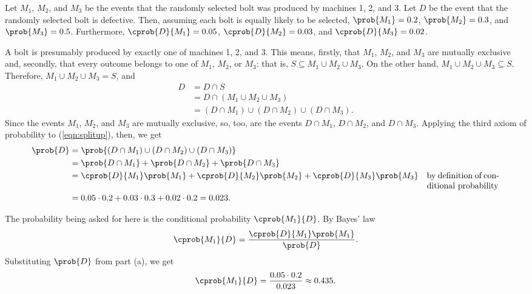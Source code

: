 \documentclass[11pt, newpage]{homework}
\begin{document}
Let \(M_1\), \(M_2\), and \(M_3\) be the events that the randomly selected bolt was produced by machines 1, 2, and 3. Let \(D\) be the event that the randomly selected bolt is defective. Then, assuming each bolt is equally likely to be selected, \(\prob{M_1} = 0.2\), \(\prob{M_2} = 0.3\), and \(\prob{M_3} = 0.5\). Furthermore, \(\cprob{D}{M_1} = 0.05\), \(\cprob{D}{M_2} = 0.03\), and \(\cprob{D}{M_3} = 0.02\).

\begin{alphaparts}
	\questionpart %
	A bolt is presumably produced by exactly one of machines 1, 2, and 3. This means, firstly, that \(M_1\), \(M_2\), and \(M_3\) are mutually exclusive and, secondly, that every outcome belongs to one of \(M_1\), \(M_2\), or \(M_3\): that is, \(S \subseteq M_1 \cup M_2 \cup M_3\). On the other hand, \(M_1 \cup M_2 \cup M_3 \subseteq S\). Therefore, \(M_1 \cup M_2 \cup M_3 = S\), and
	\begin{align}
		D &= D \cap S \nonumber \\
		&= D \cap \left(M_1 \cup M_2 \cup M_3\right) \nonumber \\
		&= \left(D\cap M_1\right) \cup \left(D \cap M_2\right) \cup \left(D \cap M_3\right). \label{eqn:splitup}
	\end{align}
	Since the events \(M_1\), \(M_2\), and \(M_3\) are mutually exclusive, so, too, are the events \(D \cap M_1\), \(D \cap M_2\), and \(D \cap M_3\). Applying the third axiom of probability to (\ref{eqn:splitup}), then, we get
	\begin{align*}
		\prob{D} &= \prob{\left(D\cap M_1\right) \cup \left(D \cap M_2\right) \cup \left(D \cap M_3\right)}\\
		&= \prob{D\cap M_1} + \prob{D\cap M_2} + \prob{D \cap M_3} \\
		&= \cprob{D}{M_1} \prob{M_1} + \cprob{D}{M_2} \prob{M_2} + \cprob{D}{M_3} \prob{M_3} & \parbox[t]{3cm}{by definition of conditional probability} \\
		&= 0.05\cdot0.2 + 0.03\cdot0.3 + 0.02\cdot0.2=0.023.
	\end{align*}

	\questionpart %
	The probability being asked for here is the conditional probability \(\cprob{M_1}{D}\). By Bayes' law
	\begin{align*}
		\cprob{M_1}{D} = \frac{\cprob{D}{M_1}\prob{M_1}}{\prob{D}}.
	\end{align*}
	Substituting \(\prob{D}\) from part (a), we get
	\begin{align*}
		\cprob{M_1}{D} = \frac{0.05\cdot0.2}{0.023} \approx 0.435.
	\end{align*}
\end{alphaparts}
\end{document}
